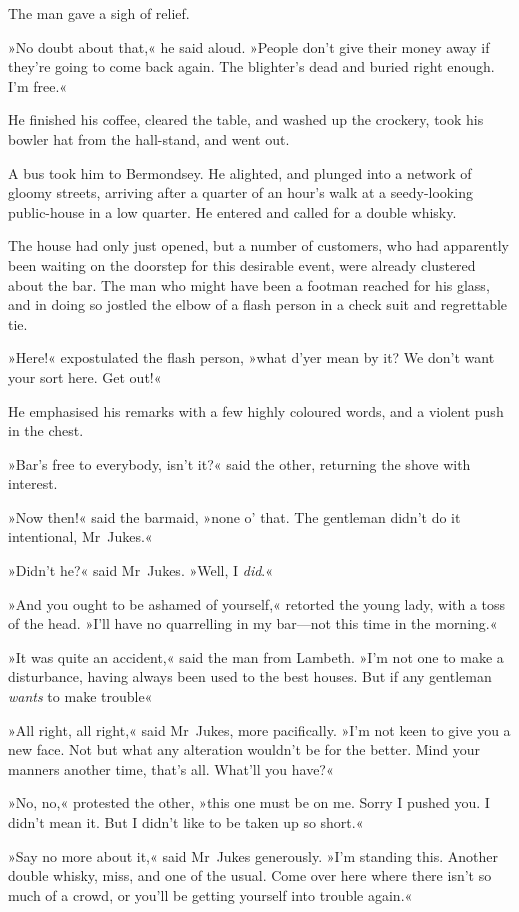 The man gave a sigh of relief.

»No doubt about that,« he said aloud. »People don't give their money away if they're going to come back again. The blighter's dead and buried right enough. I'm free.«

He finished his coffee, cleared the table, and washed up the crockery, took his bowler hat from the hall-stand, and went out.

A bus took him to Bermondsey. He alighted, and plunged into a network of gloomy streets, arriving after a quarter of an hour's walk at a seedy-looking public-house in a low quarter. He entered and called for a double whisky.

The house had only just opened, but a number of customers, who had apparently been waiting on the doorstep for this desirable event, were already clustered about the bar. The man who might have been a footman reached for his glass, and in doing so jostled the elbow of a flash person in a check suit and regrettable tie.

»Here!« expostulated the flash person, »what d'yer mean by it? We don't want your sort here. Get out!«

He emphasised his remarks with a few highly coloured words, and a violent push in the chest.

»Bar's free to everybody, isn't it?« said the other, returning the shove with interest.

»Now then!« said the barmaid, »none o' that. The gentleman didn't do it intentional, Mr~Jukes.«

»Didn't he?« said Mr~Jukes. »Well, I \textit{did}.«

»And you ought to be ashamed of yourself,« retorted the young lady, with a toss of the head. »I'll have no quarrelling in my bar—not this time in the morning.«

»It was quite an accident,« said the man from Lambeth. »I'm not one to make a disturbance, having always been used to the best houses. But if any gentleman \textit{wants} to make trouble\longdash«

»All right, all right,« said Mr~Jukes, more pacifically. »I'm not keen to give you a new face. Not but what any alteration wouldn't be for the better. Mind your manners another time, that's all. What'll you have?«

»No, no,« protested the other, »this one must be on me. Sorry I pushed you. I didn't mean it. But I didn't like to be taken up so short.«

»Say no more about it,« said Mr~Jukes generously. »I'm standing this. Another double whisky, miss, and one of the usual. Come over here where there isn't so much of a crowd, or you'll be getting yourself into trouble again.«

